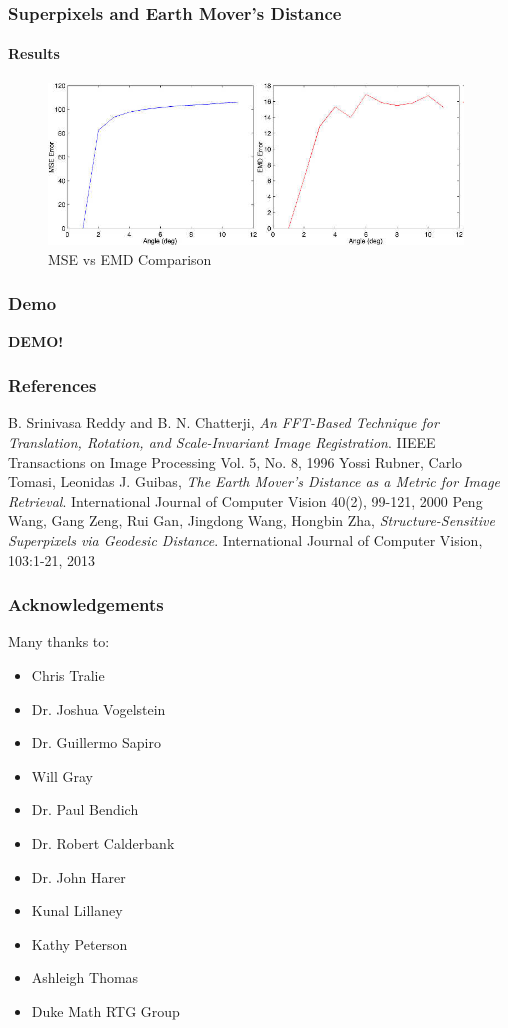 \documentclass{beamer}
\begin{document}
\begin{frame}
\frametitle{Superpixels and Earth Mover's Distance}
\framesubtitle{Results}
\begin{figure}[p]
    \centering
    \includegraphics[width=11cm]{emderror.jpg}
    \caption{MSE vs EMD Comparison}
\end{figure}
\end{frame}

\begin{frame}
\frametitle{Demo}
\textbf{DEMO!}
\end{frame}

\begin{frame}
\frametitle{References}
\begin{thebibliography}{9}
	B. Srinivasa Reddy and B. N. Chatterji,
	\emph{An FFT-Based Technique for Translation, Rotation, and Scale-Invariant Image Registration}.
	IIEEE Transactions on Image Processing Vol. 5, No. 8, 1996
	Yossi Rubner, Carlo Tomasi, Leonidas J. Guibas,
	\emph{The Earth Mover's Distance as a Metric for Image Retrieval}.
	International Journal of Computer Vision 40(2), 99-121, 2000
	Peng Wang, Gang Zeng, Rui Gan, Jingdong Wang, Hongbin Zha,
	\emph{Structure-Sensitive Superpixels via Geodesic Distance}.
	International Journal of Computer Vision, 103:1-21, 2013
\end{thebibliography} 
\end{frame}

\begin{frame}
\frametitle{Acknowledgements}
Many thanks to:
\begin{itemize}
\item Chris Tralie
\item Dr. Joshua Vogelstein
\item Dr. Guillermo Sapiro
\item Will Gray 
\item Dr. Paul Bendich 
\item Dr. Robert Calderbank
\item Dr. John Harer
\item Kunal Lillaney
\item Kathy Peterson 
\item Ashleigh Thomas 
\item Duke Math RTG Group 
\end{itemize}
\end{frame}
\end{document}
